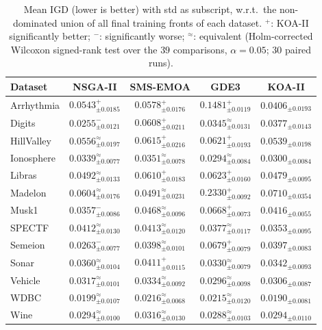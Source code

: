\begin{table}[!htbp]
\caption{Mean IGD (lower is better) with std as subscript, w.r.t.\ the non-dominated union of all final training fronts of each dataset. $^+$: KOA-II significantly better; $^-$: significantly worse; $^\approx$: equivalent (Holm-corrected Wilcoxon signed-rank test over the $39$ comparisons, $\alpha=0.05$; 30 paired runs).}
\label{tab:fs_igd}
\centering
\small
\setlength{\tabcolsep}{4pt}
\renewcommand{\arraystretch}{1.25}
\begin{tabular}{@{}lcccc@{}}
\hline
\textbf{Dataset} & \textbf{NSGA-II} & \textbf{SMS-EMOA} & \textbf{GDE3} & \textbf{KOA-II} \\
\hline
Arrhythmia & $0.0543_{\pm0.0185}^{+}$ & $0.0578_{\pm0.0176}^{+}$ & $0.1481_{\pm0.0119}^{+}$ & $\mathbf{0.0406}_{\pm0.0193}$ \\
Digits & $\mathbf{0.0255}_{\pm0.0121}^{-}$ & $0.0608_{\pm0.0211}^{+}$ & $0.0345_{\pm0.0131}^{\approx}$ & $0.0377_{\pm0.0143}$ \\
HillValley & $0.0556_{\pm0.0197}^{\approx}$ & $0.0615_{\pm0.0216}^{+}$ & $0.0621_{\pm0.0193}^{+}$ & $\mathbf{0.0539}_{\pm0.0198}$ \\
Ionosphere & $0.0339_{\pm0.0077}^{\approx}$ & $0.0351_{\pm0.0078}^{\approx}$ & $\mathbf{0.0294}_{\pm0.0084}^{\approx}$ & $0.0300_{\pm0.0084}$ \\
Libras & $0.0492_{\pm0.0133}^{\approx}$ & $0.0610_{\pm0.0183}^{+}$ & $0.0623_{\pm0.0160}^{+}$ & $\mathbf{0.0479}_{\pm0.0095}$ \\
Madelon & $0.0604_{\pm0.0176}^{\approx}$ & $\mathbf{0.0491}_{\pm0.0231}^{\approx}$ & $0.2330_{\pm0.0092}^{+}$ & $0.0710_{\pm0.0354}$ \\
Musk1 & $\mathbf{0.0357}_{\pm0.0086}^{-}$ & $0.0468_{\pm0.0096}^{\approx}$ & $0.0668_{\pm0.0073}^{+}$ & $0.0416_{\pm0.0055}$ \\
SPECTF & $0.0412_{\pm0.0130}^{\approx}$ & $0.0413_{\pm0.0120}^{\approx}$ & $0.0377_{\pm0.0117}^{\approx}$ & $\mathbf{0.0353}_{\pm0.0095}$ \\
Semeion & $\mathbf{0.0263}_{\pm0.0077}^{-}$ & $0.0398_{\pm0.0101}^{\approx}$ & $0.0679_{\pm0.0079}^{+}$ & $0.0397_{\pm0.0083}$ \\
Sonar & $0.0360_{\pm0.0104}^{\approx}$ & $0.0411_{\pm0.0115}^{+}$ & $\mathbf{0.0330}_{\pm0.0079}^{\approx}$ & $0.0342_{\pm0.0093}$ \\
Vehicle & $0.0317_{\pm0.0101}^{\approx}$ & $0.0334_{\pm0.0092}^{\approx}$ & $\mathbf{0.0296}_{\pm0.0098}^{\approx}$ & $0.0306_{\pm0.0087}$ \\
WDBC & $0.0199_{\pm0.0107}^{\approx}$ & $0.0216_{\pm0.0068}^{\approx}$ & $0.0215_{\pm0.0120}^{\approx}$ & $\mathbf{0.0190}_{\pm0.0081}$ \\
Wine & $0.0294_{\pm0.0100}^{\approx}$ & $0.0316_{\pm0.0130}^{\approx}$ & $\mathbf{0.0288}_{\pm0.0103}^{\approx}$ & $0.0294_{\pm0.0110}$ \\
\hline
\end{tabular}
\end{table}

